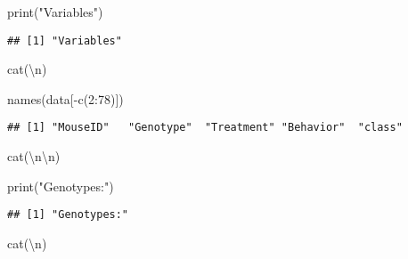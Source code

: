 \documentclass[
]{article}
\newenvironment{Shaded}{\begin{snugshade}}{\end{snugshade}}
\newcommand{\DecValTok}[1]{\textcolor[rgb]{0.00,0.00,0.81}{#1}}
\newcommand{\FunctionTok}[1]{\textcolor[rgb]{0.00,0.00,0.00}{#1}}
\newcommand{\NormalTok}[1]{#1}
\newcommand{\SpecialCharTok}[1]{\textcolor[rgb]{0.00,0.00,0.00}{#1}}
\newcommand{\StringTok}[1]{\textcolor[rgb]{0.31,0.60,0.02}{#1}}
\begin{document}
\begin{Shaded}
\begin{Highlighting}[]
\FunctionTok{print}\NormalTok{(}\StringTok{"Variables"}\NormalTok{)}
\end{Highlighting}
\end{Shaded}

\begin{verbatim}
## [1] "Variables"
\end{verbatim}

\begin{Shaded}
\begin{Highlighting}[]
\FunctionTok{cat}\NormalTok{(}\StringTok{\textquotesingle{}}\SpecialCharTok{\textbackslash{}n}\StringTok{\textquotesingle{}}\NormalTok{)}
\end{Highlighting}
\end{Shaded}

\begin{Shaded}
\begin{Highlighting}[]
\FunctionTok{names}\NormalTok{(data[}\SpecialCharTok{{-}}\FunctionTok{c}\NormalTok{(}\DecValTok{2}\SpecialCharTok{:}\DecValTok{78}\NormalTok{)])}
\end{Highlighting}
\end{Shaded}

\begin{verbatim}
## [1] "MouseID"   "Genotype"  "Treatment" "Behavior"  "class"
\end{verbatim}

\begin{Shaded}
\begin{Highlighting}[]
\FunctionTok{cat}\NormalTok{(}\StringTok{\textquotesingle{}}\SpecialCharTok{\textbackslash{}n\textbackslash{}n}\StringTok{\textquotesingle{}}\NormalTok{)}
\end{Highlighting}
\end{Shaded}

\begin{Shaded}
\begin{Highlighting}[]
\FunctionTok{print}\NormalTok{(}\StringTok{"Genotypes:"}\NormalTok{)}
\end{Highlighting}
\end{Shaded}

\begin{verbatim}
## [1] "Genotypes:"
\end{verbatim}

\begin{Shaded}
\begin{Highlighting}[]
\FunctionTok{cat}\NormalTok{(}\StringTok{\textquotesingle{}}\SpecialCharTok{\textbackslash{}n}\StringTok{\textquotesingle{}}\NormalTok{)}
\end{Highlighting}
\end{Shaded}
\end{document}
